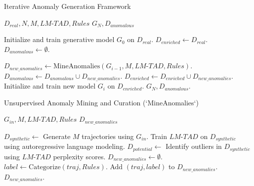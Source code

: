 \documentclass[runningheads]{llncs}
\begin{document}
\begin{algorithm}[h!]
\caption{Iterative Anomaly Generation Framework}\label{alg:iterative-generation}
\begin{algorithmic}[1]
\Require $D_{real}, N, M, LM\text{-}TAD, Rules$
\Ensure $G_N, D_{anomalous}$

\State Initialize and train generative model $G_0$ on $D_{real}$.
\State $D_{enriched} \gets D_{real}$.
\State $D_{anomalous} \gets \emptyset$.

    \State $D_{new\_anomalies} \gets \text{MineAnomalies}(G_{i-1}, M, LM\text{-}TAD, Rules)$.
    \State $D_{anomalous} \gets D_{anomalous} \cup D_{new\_anomalies}$.
    \State $D_{enriched} \gets D_{enriched} \cup D_{new\_anomalies}$.
    \State Initialize and train new model $G_i$ on $D_{enriched}$.
\EndFor
\State \Return $G_N, D_{anomalous}$.
\end{algorithmic}
\end{algorithm}

\begin{algorithm}[h!]
\caption{Unsupervised Anomaly Mining and Curation (`MineAnomalies`)}\label{alg:anomaly-mining}
\begin{algorithmic}[1]
\Require $G_{in}, M, LM\text{-}TAD, Rules$
\Ensure $D_{new\_anomalies}$

\State $D_{synthetic} \gets$ Generate $M$ trajectories using $G_{in}$.
\State Train $LM\text{-}TAD$ on $D_{synthetic}$ using autoregressive language modeling.
\State $D_{potential} \gets$ Identify outliers in $D_{synthetic}$ using $LM\text{-}TAD$ perplexity scores.
\State $D_{new\_anomalies} \gets \emptyset$.
    \State $label \gets \text{Categorize}(traj, Rules)$.
        \State Add $(traj, label)$ to $D_{new\_anomalies}$.
    \EndIf
\EndFor
\State \Return $D_{new\_anomalies}$.
\end{algorithmic}
\end{algorithm}
\end{document}
